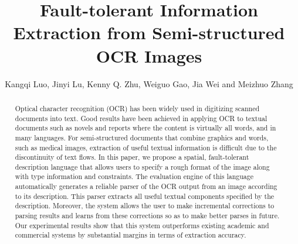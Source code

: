 \documentclass[Afour,sageh,times]{sagej}
\begin{document}

\title{Fault-tolerant Information Extraction from Semi-structured OCR Images}

\author{
    Kangqi Luo,
    Jinyi Lu,
    Kenny Q. Zhu,
    Weiguo Gao,
    Jia Wei and
    Meizhuo Zhang}



\begin{abstract}
Optical character recognition (OCR) has been widely used in digitizing scanned
documents into text. Good results have been achieved in applying OCR to textual
documents such as novels and reports where the 
content is virtually all words, and in many languages. 
For semi-structured documents that combine graphics and words,
such as medical images, extraction of useful textual information is difficult
due to the discontinuity of text flows. In this paper, we 
propose a spatial, fault-tolerant description language that allows users to 
specify a rough format of the image along with type information and
constraints. 
The evaluation engine of this language automatically generates a
reliable parser of the OCR output from an image according to 
its description. This parser extracts all useful textual components specified
by the description. Moreover, the system allows
the user to make incremental corrections to parsing results 
and learns from these corrections so as to make better parses in future. 
Our experimental results show
that this system outperforms existing academic and commercial systems by
substantial margins in terms of extraction accuracy.
\end{abstract}


\maketitle
\end{document}
